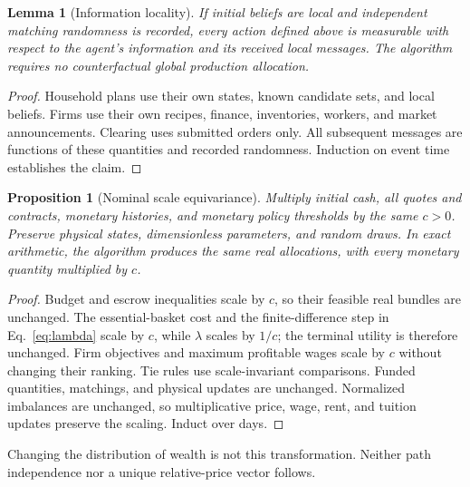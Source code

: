 \documentclass[10pt,a4paper,twocolumn]{article}
\newtheorem{proposition}{Proposition}
\newtheorem{lemma}{Lemma}
\begin{document}
\begin{lemma}[Information locality]
If initial beliefs are local and independent matching randomness is
recorded, every action defined above is measurable with respect to the
agent's information and its received local messages. The algorithm
requires no counterfactual global production allocation.
\end{lemma}
\begin{proof}
Household plans use their own states, known candidate sets, and local
beliefs. Firms use their own recipes, finance, inventories, workers, and
market announcements. Clearing uses submitted orders only. All
subsequent messages are functions of these quantities and recorded
randomness. Induction on event time establishes the claim.
\end{proof}

\begin{proposition}[Nominal scale equivariance]
Multiply initial cash, all quotes and contracts, monetary histories, and
monetary policy thresholds by the same $c>0$. Preserve physical states,
dimensionless parameters, and random draws. In exact arithmetic, the
algorithm produces the same real allocations, with every monetary
quantity multiplied by $c$.
\end{proposition}
\begin{proof}
Budget and escrow inequalities scale by $c$, so their feasible real
bundles are unchanged. The essential-basket cost and the finite-difference
step in Eq.~\eqref{eq:lambda} scale by $c$, while $\lambda$ scales by
$1/c$; the terminal utility is therefore unchanged. Firm objectives and
maximum profitable wages scale by $c$ without changing their ranking.
Tie rules use scale-invariant comparisons. Funded quantities, matchings,
and physical updates are unchanged. Normalized imbalances are unchanged,
so multiplicative price, wage, rent, and tuition updates preserve the
scaling. Induct over days.
\end{proof}
Changing the distribution of wealth is not this transformation. Neither
path independence nor a unique relative-price vector follows.
\end{document}
